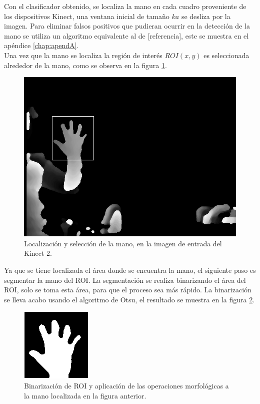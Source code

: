 Con el clasificador obtenido, se localiza la mano en cada cuadro proveniente de los dispositivos  Kinect, una ventana  inicial de tamaño $ka$ se desliza por la imagen. Para eliminar falsos positivos que pudieran ocurrir en la detección de la mano se utiliza un algoritmo equivalente al de [referencia], este se muestra en el apéndice \ref{chap:apendA}.\\ 
Una vez que la mano se localiza la región de interés $ROI(x,y)$ es seleccionada alrededor de la mano, como se observa en la figura \ref{fig:Roi}.

\begin{figure}[h!]
\begin{center}
\includegraphics[scale=.35]{./Figures/DS_252.png}
\end{center}
\caption{Localización y selección de la mano, en la imagen de entrada del Kinect 2.}
\label{fig:Roi}
\end{figure}  

Ya que se tiene localizada el área donde se encuentra la mano, el siguiente paso es segmentar la mano del ROI. La segmentación se realiza binarizando el área del ROI, solo se toma esta área, para que el proceso sea más rápido. La binarizaci\'on se lleva acabo usando el algoritmo de Otsu, el resultado se muestra en la figura \ref{fig:BinarizationRoi}. 
  
\begin{figure}[h!]
\begin{center}
\includegraphics[scale=1]{./Figures/250B_Otsu.png}
\end{center}
\caption{Binarización de ROI y aplicación de las operaciones morfológicas a la mano localizada en la figura anterior.}
\label{fig:BinarizationRoi}
\end{figure} 


